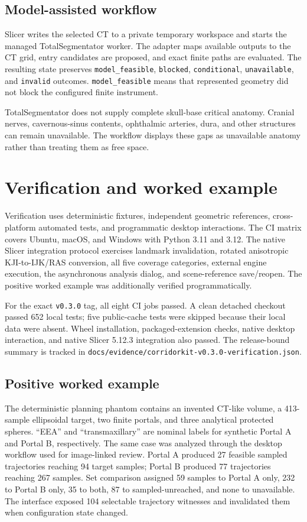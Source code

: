 \documentclass[preprint,12pt]{elsarticle}
\begin{document}
\subsection{Model-assisted workflow}

Slicer writes the selected CT to a private temporary workspace and starts the managed TotalSegmentator worker. The adapter maps available outputs to the CT grid, entry candidates are proposed, and exact finite paths are evaluated. The resulting state preserves \texttt{model\_feasible}, \texttt{blocked}, \texttt{conditional}, \texttt{unavailable}, and \texttt{invalid} outcomes. \texttt{model\_feasible} means that represented geometry did not block the configured finite instrument.

TotalSegmentator does not supply complete skull-base critical anatomy. Cranial nerves, cavernous-sinus contents, ophthalmic arteries, dura, and other structures can remain unavailable. The workflow displays these gaps as unavailable anatomy rather than treating them as free space.

\section{Verification and worked example}

Verification uses deterministic fixtures, independent geometric references, cross-platform automated tests, and programmatic desktop interactions. The CI matrix covers Ubuntu, macOS, and Windows with Python 3.11 and 3.12. The native Slicer integration protocol exercises landmark invalidation, rotated anisotropic KJI-to-IJK/RAS conversion, all five coverage categories, external engine execution, the asynchronous analysis dialog, and scene-reference save/reopen. The positive worked example was additionally verified programmatically.

For the exact \texttt{v0.3.0} tag, all eight CI jobs passed. A clean detached checkout passed 652 local tests; five public-cache tests were skipped because their local data were absent. Wheel installation, packaged-extension checks, native desktop interaction, and native Slicer 5.12.3 integration also passed. The release-bound summary is tracked in \texttt{docs/evidence/corridorkit-v0.3.0-verification.json}.

\subsection{Positive worked example}

The deterministic planning phantom contains an invented CT-like volume, a 413-sample ellipsoidal target, two finite portals, and three analytical protected spheres. ``EEA'' and ``transmaxillary'' are nominal labels for synthetic Portal A and Portal B, respectively. The same case was analyzed through the desktop workflow used for image-linked review. Portal A produced 27 feasible sampled trajectories reaching 94 target samples; Portal B produced 77 trajectories reaching 267 samples. Set comparison assigned 59 samples to Portal A only, 232 to Portal B only, 35 to both, 87 to sampled-unreached, and none to unavailable. The interface exposed 104 selectable trajectory witnesses and invalidated them when configuration state changed.
\end{document}
